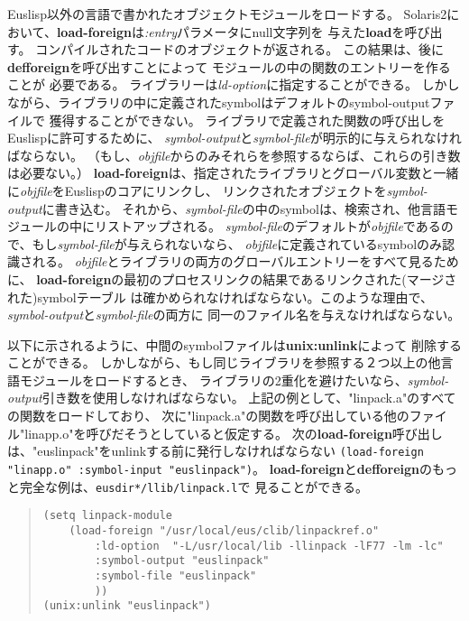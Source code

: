 \begin{refdesc}

{Euslisp以外の言語で書かれたオブジェクトモジュールをロードする。
Solaris2において、{\bf load-foreign}は{\em :entry}パラメータにnull文字列を
与えた{\bf load}を呼び出す。
コンパイルされたコードのオブジェクトが返される。
この結果は、後に{\bf defforeign}を呼び出すことによって
モジュールの中の関数のエントリーを作ることが
必要である。
ライブラリーは{\em ld-option}に指定することができる。
しかしながら、ライブラリの中に定義されたsymbolはデフォルトのsymbol-outputファイルで
獲得することができない。
ライブラリで定義された関数の呼び出しをEuslispに許可するために、
{\em symbol-output}と{\em symbol-file}が明示的に与えられなければならない。
（もし、{\em objfile}からのみそれらを参照するならば、これらの引き数は必要ない。）
{\bf load-foreign}は、指定されたライブラリとグローバル変数と一緒に{\em objfile}をEuslispのコアにリンクし、
リンクされたオブジェクトを{\em symbol-output}に書き込む。
それから、{\em symbol-file}の中のsymbolは、検索され、他言語モジュールの中にリストアップされる。
{\em symbol-file}のデフォルトが{\em objfile}であるので、もし{\em symbol-file}が与えられないなら、
{\em objfile}に定義されているsymbolのみ認識される。
{\em objfile}とライブラリの両方のグローバルエントリーをすべて見るために、
{\bf load-foreign}の最初のプロセスリンクの結果であるリンクされた(マージされた)symbolテーブル
は確かめられなければならない。このような理由で、{\em symbol-output}と{\em symbol-file}の両方に
同一のファイル名を与えなければならない。

以下に示されるように、中間のsymbolファイルは{\bf unix:unlink}によって
削除することができる。
しかしながら、もし同じライブラリを参照する２つ以上の他言語モジュールをロードするとき、
ライブラリの2重化を避けたいなら、{\em symbol-output}引き数を使用しなければならない。
上記の例として、"linpack.a"のすべての関数をロードしており、
次に"linpack.a"の関数を呼び出している他のファイル"linapp.o"を呼びだそうとしていると仮定する。
次の{\bf load-foreign}呼び出しは、"euslinpack"をunlinkする前に発行しなければならない
{\tt (load-foreign "linapp.o" :symbol-input "euslinpack")}。
{\bf load-foreign}と{\bf defforeign}のもっと完全な例は、{\tt *eusdir*/llib/linpack.l}で
見ることができる。
}
\begin{quote}
\begin{verbatim}
(setq linpack-module
    (load-foreign "/usr/local/eus/clib/linpackref.o"
        :ld-option  "-L/usr/local/lib -llinpack -lF77 -lm -lc"
        :symbol-output "euslinpack"
        :symbol-file "euslinpack"
        ))
(unix:unlink "euslinpack")
\end{verbatim}
\end{quote}


\end{refdesc}
